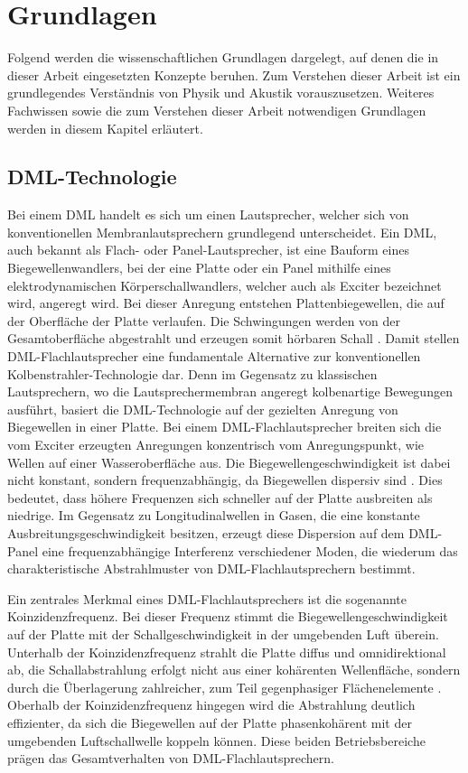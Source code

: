 \chapter{Grundlagen}

Folgend werden die wissenschaftlichen Grundlagen dargelegt, auf denen die in dieser Arbeit eingesetzten Konzepte beruhen. Zum Verstehen dieser Arbeit ist ein grundlegendes Verständnis von Physik und Akustik vorauszusetzen. Weiteres Fachwissen sowie die zum Verstehen dieser Arbeit notwendigen Grundlagen werden in diesem Kapitel erläutert. 


\section{DML-Technologie}

Bei einem DML handelt es sich um einen Lautsprecher, welcher sich von konventionellen Membranlautsprechern grundlegend unterscheidet. Ein DML, auch bekannt als Flach- oder Panel-Lautsprecher, ist eine Bauform eines Biegewellenwandlers, bei der eine Platte oder ein Panel mithilfe eines elektrodynamischen Körperschallwandlers, welcher auch als Exciter bezeichnet wird, angeregt wird. Bei dieser Anregung entstehen Plattenbiegewellen, die auf der Oberfläche der Platte verlaufen. Die Schwingungen werden von der Gesamtoberfläche abgestrahlt und erzeugen somit hörbaren Schall \cite{Moeser2005}. Damit stellen DML-Flachlautsprecher eine fundamentale Alternative zur konventionellen Kolbenstrahler-Technologie dar. Denn im Gegensatz zu klassischen Lautsprechern, wo die Lautsprechermembran angeregt kolbenartige Bewegungen ausführt, basiert die DML-Technologie auf der gezielten Anregung von Biegewellen in einer Platte. 
Bei einem DML-Flachlautsprecher breiten sich die vom Exciter erzeugten Anregungen konzentrisch vom Anregungspunkt, wie Wellen auf einer Wasseroberfläche aus. Die Biegewellengeschwindigkeit ist dabei nicht konstant, sondern frequenzabhängig, da Biegewellen dispersiv sind \cite{Moeser2005}. Dies bedeutet, dass höhere Frequenzen sich schneller auf der Platte ausbreiten als niedrige. Im Gegensatz zu Longitudinalwellen in Gasen, die eine konstante Ausbreitungsgeschwindigkeit besitzen, erzeugt diese Dispersion auf dem DML-Panel eine frequenzabhängige Interferenz verschiedener Moden, die wiederum das charakteristische Abstrahlmuster von DML-Flachlautsprechern bestimmt.


Ein zentrales Merkmal eines DML-Flachlautsprechers ist die sogenannte Koinzidenzfrequenz. Bei dieser Frequenz stimmt die Biegewellengeschwindigkeit auf der Platte mit der Schallgeschwindigkeit in der umgebenden Luft überein. Unterhalb der Koinzidenzfrequenz strahlt die Platte diffus und omnidirektional ab, die Schallabstrahlung erfolgt nicht aus einer kohärenten Wellenfläche, sondern durch die Überlagerung zahlreicher, zum Teil gegenphasiger Flächenelemente \cite{Cremer1996}. Oberhalb der Koinzidenzfrequenz hingegen wird die Abstrahlung deutlich effizienter, da sich die Biegewellen auf der Platte phasenkohärent mit der umgebenden Luftschallwelle koppeln können. Diese beiden Betriebsbereiche prägen das Gesamtverhalten von DML-Flachlautsprechern.


